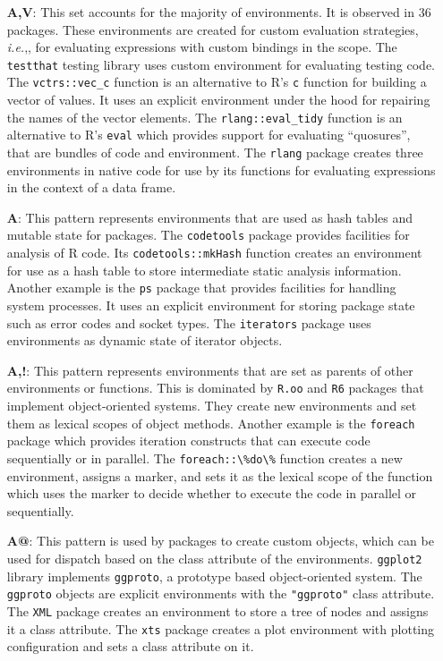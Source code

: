 \documentclass[10pt,review,sigplan,authorversion=true]{acmart}
\renewcommand{\c}[1]{\lstinline |#1|\xspace}
\newcommand{\ie}{\emph{i.e.},\xspace}
\begin{document}
\begin{itemize}
  \item[{\bf A,V}:]
This set accounts for the majority of environments. It is
observed in 36 packages. These environments are created for custom evaluation
strategies, \ie, for evaluating expressions with custom bindings in the scope.
The \c{testthat} testing library uses custom environment for evaluating
testing code. The \c{vctrs::vec_c} function is an alternative to R's \c{c}
function for building a vector of values. It uses an explicit environment under
the hood for repairing the names of the vector elements. The
\c{rlang::eval_tidy} function is an alternative to R's \c{eval} which
provides support for evaluating ``quosures'', that are bundles of code and
environment. The \c{rlang} package creates three environments in native code
for use by its functions for evaluating expressions in the context of a data
frame.
\item[{\bf A}:]
This pattern represents environments that are used as hash tables
and mutable state for packages. The \c{codetools} package provides facilities
for analysis of R code. Its \c{codetools::mkHash} function creates an
environment for use as a hash table to store intermediate static analysis
information. Another example is the \c{ps} package that provides facilities
for handling system processes. It uses an explicit environment for storing
package state such as error codes and socket types. The \c{iterators} package
uses environments as dynamic state of iterator objects.

\item[{\bf A,!}:]
This pattern represents environments that are set as parents of
other environments or functions. This is dominated by \c{R.oo} and \c{R6}
packages that implement object-oriented systems. They create new environments
and set them as lexical scopes of object methods. Another example is the
\c{foreach} package which provides iteration constructs that can execute code
sequentially or in parallel. The \c{foreach::\%do\%} function creates a new
environment, assigns a marker, and sets it as the lexical scope of the function
which uses the marker to decide whether to execute the code in parallel or
sequentially.

\item[{\bf A@}:]
This pattern is used by packages to create custom objects, which
can be used for dispatch based on the class attribute of the environments.
\c{ggplot2} library implements \c{ggproto}, a prototype based
object-oriented system. The \c{ggproto} objects are explicit environments
with the \c{"ggproto"} class attribute. The \c{XML} package creates an
environment to store a tree of nodes and assigns it a class attribute. The
\c{xts} package creates a plot environment with plotting configuration and
sets a class attribute on it.


\end{itemize}
\end{document}
